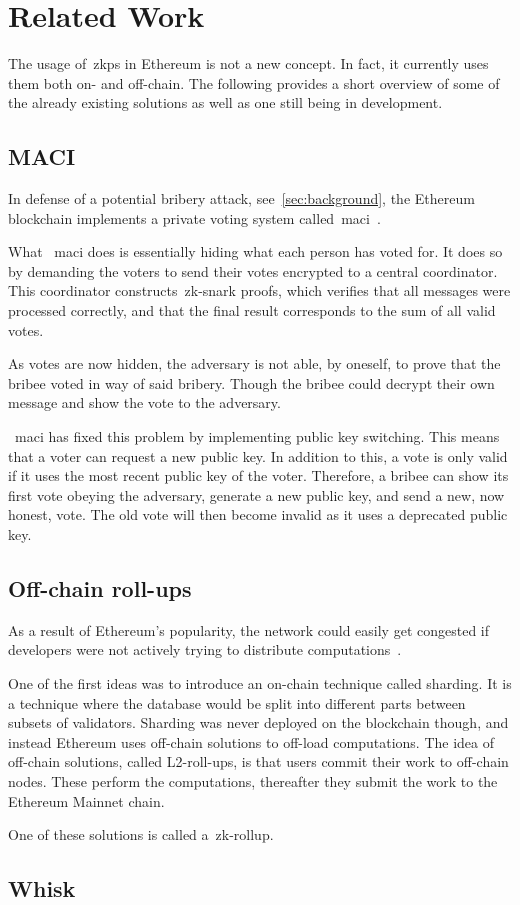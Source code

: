 
\section{Related Work}\label{sec:related-work}
The usage of~\glspl{zkp} in Ethereum is not a new concept.
In fact, it currently uses them both on- and off-chain.
The following provides a short overview of some of the already existing solutions as well as one still being in development.
\subsection{MACI}\label{subsec:MACI}
In defense of a potential bribery attack, see~\autoref{sec:background}, the Ethereum blockchain implements a private voting system called~\gls{maci}~\cite{EthereumAttacks2024,MACI2022}.

What ~\gls{maci} does is essentially hiding what each person has voted for.
It does so by demanding the voters to send their votes encrypted to a central coordinator.
This coordinator constructs~\gls{zk-snark} proofs, which verifies that all messages were processed correctly, and that the final result corresponds to the sum of all valid votes.

As votes are now hidden, the adversary is not able, by oneself, to prove that the bribee voted in way of said bribery.
Though the bribee could decrypt their own message and show the vote to the adversary.

~\gls{maci} has fixed this problem by implementing public key switching.
This means that a voter can request a new public key.
In addition to this, a vote is only valid if it uses the most recent public key of the voter.
Therefore, a bribee can show its first vote obeying the adversary, generate a new public key, and send a new, now honest, vote.
The old vote will then become invalid as it uses a deprecated public key.

\subsection{Off-chain roll-ups}\label{subsec:off-chain-roll-ups}
As a result of Ethereum's popularity, the network could easily get congested if developers were not actively trying to distribute computations~\cite{EthereumScaling2024}.

One of the first ideas was to introduce an on-chain technique called sharding.
It is a technique where the database would be split into different parts between subsets of validators.
Sharding was never deployed on the blockchain though, and instead Ethereum uses off-chain solutions to off-load computations.
The idea of off-chain solutions, called L2-roll-ups, is that users commit their work to off-chain nodes.
These perform the computations, thereafter they submit the work to the Ethereum Mainnet chain.

One of these solutions is called a~\gls{zk-rollup}.
\subsection{Whisk}\label{subsec:whisk}

